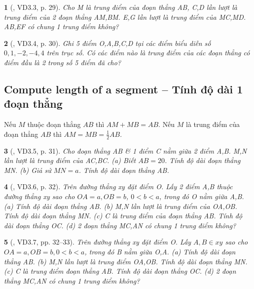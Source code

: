 \documentclass{article}
\newtheorem{baitoan}{}
\begin{document}
\begin{baitoan}[\cite{TLCT_THCS_Toan_6_hinh_hoc}, VD3.3, p. 29]
	Cho M là trung điểm của đoạn thẳng AB, C,D lần lượt là trung điểm của 2 đoạn thẳng AM,BM. E,G lần lượt là trung điểm của MC,MD. AB,EF có chung 1 trung điểm không?
\end{baitoan}

\begin{baitoan}[\cite{TLCT_THCS_Toan_6_hinh_hoc}, VD3.4, p. 30]
	Ghi 5 điểm O,A,B,C,D tại các điểm biểu diễn số $0,1,-2,-4,4$ trên trục số. Có các điểm nào là trung điểm của các đoạn thẳng có điểm đầu là 2 trong số 5 điểm đã cho?
\end{baitoan}


\subsection{Compute length of a segment -- Tính độ dài 1 đoạn thẳng}
 Nếu $M$ thuộc đoạn thẳng $AB$ thì $AM + MB = AB$.  Nếu $M$ là trung điểm của đoạn thẳng $AB$ thì $AM = MB = \frac{1}{2}AB$.

\begin{baitoan}[\cite{TLCT_THCS_Toan_6_hinh_hoc}, VD3.5, p. 31]
	Cho đoạn thẳng AB \& 1 điểm C nằm giữa 2 điểm A,B. M,N lần lượt là trung điểm của AC,BC. (a) Biết $AB = 20$. Tính độ dài đoạn thẳng MN. (b) Giả sử $MN = a$. Tính độ dài đoạn thẳng AB.
\end{baitoan}

\begin{baitoan}[\cite{TLCT_THCS_Toan_6_hinh_hoc}, VD3.6, p. 32]
	Trên đường thẳng xy đặt điểm O. Lấy 2 điểm A,B thuộc đường thẳng xy sao cho $OA = a,OB = b$, $0 < b < a$, trong đó O nằm giữa A,B. (a) Tính độ dài đoạn thẳng AB. (b) M,N lần lượt là trung điểm của OA,OB. Tính độ dài đoạn thẳng MN. (c) C là trung điểm của đoạn thẳng AB. Tính độ dài đoạn thẳng OC. (d) 2 đoạn thẳng MC,AN có chung 1 trung điểm không?
\end{baitoan}

\begin{baitoan}[\cite{TLCT_THCS_Toan_6_hinh_hoc}, VD3.7, pp. 32--33]
	Trên đường thẳng xy đặt điểm O. Lấy $A,B\in xy$ sao cho $OA = a,OB = b,0 < b < a$, trong đó B nằm giữa O,A. (a) Tính độ dài đoạn thẳng AB. (b) M,N lần lượt là trung điểm OA,OB. Tính độ dài đoạn thẳng MN. (c) C là trung điểm đoạn thẳng AB. Tính độ dài đoạn thẳng OC. (d) 2 đoạn thẳng MC,AN có chung 1 trung điểm không?
\end{baitoan}
\end{document}
